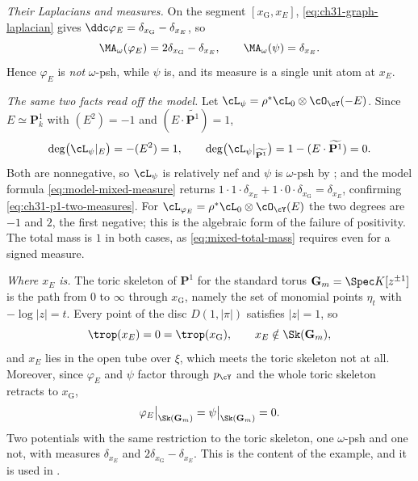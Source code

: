 \begin{example}
\emph{Their Laplacians and measures.}  On the segment
\([x_{\mathrm G},x_E]\), \eqref{eq:ch31-graph-laplacian} gives
\(\ddc\varphi_E=\delta_{x_{\mathrm G}}-\delta_{x_E}\), so
\begin{equation}
\label{eq:ch31-p1-two-measures}
 \MA_\omega(\varphi_E)=2\delta_{x_{\mathrm G}}-\delta_{x_E},
 \qquad
 \MA_\omega(\psi)=\delta_{x_E}.
\end{equation}
Hence \(\varphi_E\) is \emph{not} \(\omega\)-psh, while \(\psi\) is, and its
measure is a single unit atom at \(x_E\).

\emph{The same two facts read off the model.}  Let
\(\cL_\psi=\rho^*\cL_0\otimes\cO_{\cY}(-E)\).  Since \(E\simeq\mathbf P^1_k\)
with \((E^2)=-1\) and \((E\cdot\widetilde{\mathbf P^1})=1\),
\[
 \deg\bigl(\cL_\psi|_E\bigr)=-(E^2)=1,
 \qquad
 \deg\bigl(\cL_\psi|_{\widetilde{\mathbf P^1}}\bigr)
  =1-(E\cdot\widetilde{\mathbf P^1})=0 .
\]
Both are nonnegative, so \(\cL_\psi\) is relatively nef and \(\psi\) is
\(\omega\)-psh by ; and the model formula
\eqref{eq:model-mixed-measure} returns
\(1\cdot1\cdot\delta_{x_E}+1\cdot0\cdot\delta_{x_{\mathrm G}}=\delta_{x_E}\),
confirming \eqref{eq:ch31-p1-two-measures}.  For \(\cL_{\varphi_E}
=\rho^*\cL_0\otimes\cO_{\cY}(E)\) the two degrees are \(-1\) and \(2\), the
first negative; this is the algebraic form of the failure of positivity.
The total mass is \(1\) in both cases, as \eqref{eq:mixed-total-mass}
requires even for a signed measure.

\emph{Where \(x_E\) is.}  The toric skeleton of \(\mathbf P^1\) for the
standard torus \(\mathbf G_m=\Spec K[z^{\pm1}]\) is the path from \(0\) to
\(\infty\) through \(x_{\mathrm G}\), namely the set of monomial points
\(\eta_t\) with \(-\log|z|=t\).  Every point of the disc \(D(1,|\pi|)\)
satisfies \(|z|=1\), so
\begin{equation}
\label{eq:ch31-p1-trop-collapse}
 \trop(x_E)=0=\trop(x_{\mathrm G}),
 \qquad x_E\notin\Sk(\mathbf G_m),
\end{equation}
and \(x_E\) lies in the open tube over \(\xi\), which meets the toric
skeleton not at all.  Moreover, since \(\varphi_E\) and \(\psi\) factor
through \(p_{\cY}\) and the whole toric skeleton retracts to
\(x_{\mathrm G}\),
\begin{equation}
\label{eq:ch31-p1-restrictions-agree}
 \varphi_E\big|_{\Sk(\mathbf G_m)}
 =\psi\big|_{\Sk(\mathbf G_m)}=0 .
\end{equation}
Two potentials with the same restriction to the toric skeleton, one
\(\omega\)-psh and one not, with measures \(\delta_{x_E}\) and
\(2\delta_{x_{\mathrm G}}-\delta_{x_E}\).  This is the content of the
example, and it is used in .


\end{example}
